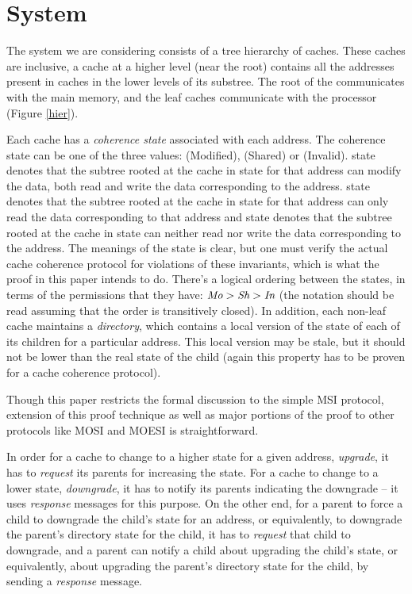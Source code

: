 \section{System}
\label{sec:System}

The system we are considering consists of a tree hierarchy of caches. These
caches are inclusive, \ie a cache at a higher level (near the root) contains
all the addresses present in caches in the lower levels of its substree. The
root of the communicates with the main memory, and the leaf caches communicate
with the processor (Figure \ref{hier}).

Each cache has a \emph{coherence state} associated with each address. The
coherence state can be one of the three values: \Mo{} (Modified), \Sh{} (Shared) or
\In{} (Invalid). \Mo{} state denotes that the subtree rooted at the cache in \Mo{}
state for that address can modify the data, \ie{} both read and write the data
corresponding to the address. \Sh{} state denotes that the subtree rooted at the
cache in \Sh{} state for that address can only read the data corresponding to
that address and \In{} state denotes that the subtree rooted at the cache in \In{}
state can neither read nor write the data corresponding to the address. The
meanings of the state is clear, but one must verify the actual cache coherence
protocol for violations of these invariants, which is what the proof in this
paper intends to do. There's a logical ordering between the states, in terms of
the permissions that they have: $\textit{Mo} > \textit{Sh} > \textit{In}$ (the notation should be read
assuming that the order is transitively closed).
In addition, each non-leaf cache maintains a \emph{directory}, which contains a
local version of the state of each of its children for a particular address.
This local version may be stale, but it should not be lower than the real state
of the child (again this property has to be proven for a cache coherence
protocol).

Though this paper restricts the formal discussion to the simple MSI protocol,
extension of this proof technique as well as major portions of the proof to
other protocols like MOSI and MOESI is straightforward.

In order for a cache to change to a higher state for a given address, \ie
\emph{upgrade}, it has to \emph{request} its parents for increasing the state.
For a cache to change to a lower state, \ie \emph{downgrade}, it has to notify
its parents indicating the downgrade -- it uses \emph{response} messages for
this purpose. On the other end, for a parent to force a child to downgrade the
child's state for an address, or equivalently, to downgrade the parent's
directory state for the child, it has to \emph{request} that child to
downgrade, and a parent can notify a child about upgrading the child's state,
or equivalently, about upgrading the parent's directory state for the child, by
sending a \emph{response} message.

